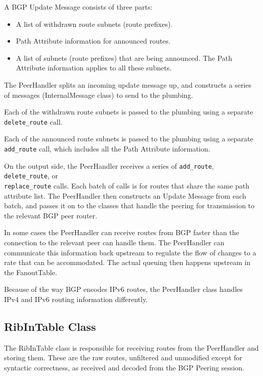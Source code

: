 \documentclass[11pt]{article}
\begin{document}
A BGP Update Message consists of three parts:

\begin{itemize}

  \item A list of withdrawn route subnets (route prefixes).

  \item Path Attribute information for announced routes.

  \item A list of subnets (route prefixes) that are being announced.
  The Path Attribute information applies to all these subnets.

\end{itemize}

The PeerHandler splits an incoming update message up, and constructs a
series of messages (InternalMessage class) to send to the plumbing.

Each of the withdrawn route subnets is passed to the plumbing using a
separate {\tt delete\_route} call.

Each of the announced route subnets is passed to the plumbing using a
separate {\tt add\_route} call, which includes all the Path Attribute
information.

On the output side, the PeerHandler receives a series of {\tt add\_route},
{\tt delete\_route}, or \\
{\tt replace\_route} calls.  Each batch of calls is for
routes that share the same path attribute list.  The PeerHandler then
constructs an Update Message from each batch, and passes it on to the
classes that handle the peering for transmission to the relevant BGP
peer router. 

In some cases the PeerHandler can receive routes from BGP faster than
the connection to the relevant peer can handle them.  The PeerHandler
can communicate this information back upstream to regulate the flow of
changes to a rate that can be accommodated.  The actual queuing then
happens upstream in the FanoutTable.

Because of the way BGP encodes IPv6 routes, the PeerHandler class
handles IPv4 and IPv6 routing information differently.

\subsection{RibInTable Class}

The RibInTable class is responsible for receiving routes from the
PeerHandler and storing them.  These are the raw routes, unfiltered
and unmodified except for syntactic correctness, as received and
decoded from the BGP Peering session.
\end{document}
